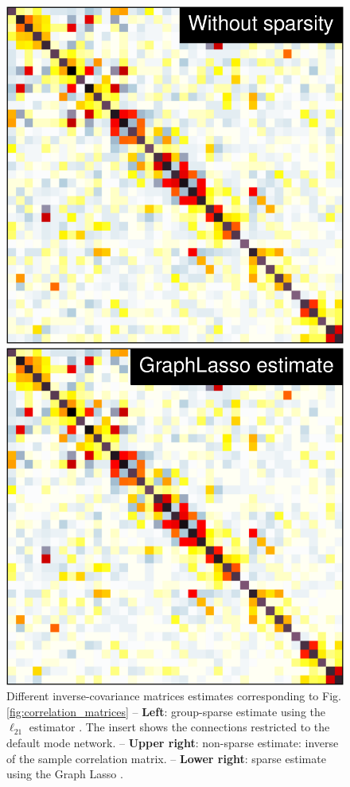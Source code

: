 \documentclass[5p]{elsarticle}
\begin{document}
\begin{figure}
\begin{minipage}{.33\linewidth}%
    \includegraphics[width=\linewidth]{group_emp_prec.pdf}%

    \includegraphics[width=\linewidth]{group_l1_prec.pdf}%
\end{minipage}%

\caption{
Different inverse-covariance matrices estimates corresponding to
Fig.\,\ref{fig:correlation_matrices} -- \textbf{Left}: group-sparse estimate
using the $\ell_{21}$ estimator \cite{varoquaux2010c}.
The insert shows the
connections restricted to the default mode network. -- \textbf{Upper
right}: non-sparse estimate: inverse of the sample correlation matrix. --
\textbf{Lower right}: sparse estimate using the Graph Lasso
\cite{friedman2008}.
\label{fig:icov_estimators}
}
\end{figure}
\end{document}
